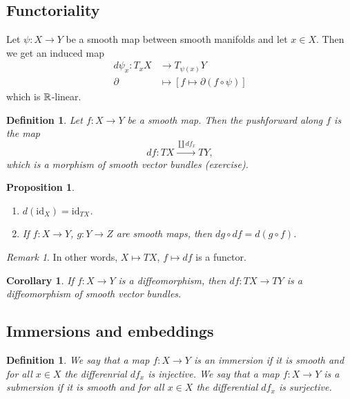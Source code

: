 \documentclass[A4paper, british]{amsart}
\theoremstyle{darkgreentheorem}
\newtheorem{prop}[thm]{Proposition}
\newtheorem{cor}[thm]{Corollary}
\theoremstyle{darkbluedefinition}
\newtheorem{defn}[thm]{Definition}
\theoremstyle{darkredexample}
\theoremstyle{remark}
\newtheorem{rem}[thm]{Remark}
\newcommand{\1}{\mathbbm{1}}
\newcommand{\id}{\mathrm{id}}
\begin{document}
\subsection{Functoriality}

Let $\psi\colon X\to Y$ be a smooth map between smooth manifolds and let $x\in X$.
Then we get an induced map
\begin{align*}
    d\psi_{x}\colon T_{x}X&\longrightarrow T_{\psi(x)}Y \\
    \partial &\longmapsto [f\mapsto \partial(f\circ \psi)]
\end{align*}
which is $\mathbb{R}$-linear.

\begin{defn}
    Let $f\colon X\to Y$ be a smooth map.
    Then the \textit{pushforward along $f$} is the map
    \[df\colon TX\xrightarrow{\coprod df_{x}} TY, \]
    which is a morphism of smooth vector bundles (exercise).
\end{defn}

\begin{prop}
    \begin{enumerate}
	\item $d(\id_{X})=\id_{TX}$.
	\item If $f\colon X\to Y$, $g\colon Y\to Z$ are smooth maps, then $dg\circ df=d(g\circ f)$.
    \end{enumerate}
\end{prop}

\begin{rem}
    In other words, $X\mapsto TX$, $f\mapsto df$ is a functor.
\end{rem}

\begin{cor}
    If $f\colon X\to Y$ is a diffeomorphism, then $df\colon TX\to TY$ is a diffeomorphism of smooth vector bundles.
\end{cor}

\subsection{Immersions and embeddings}

\begin{defn}
    We say that a map $f\colon X\to Y$ is an \textit{immersion} if it is smooth and for all $x\in X$ the differenrial $df_{x}$ is injective.
    We say that a map $f\colon X\to Y$ is a \textit{submersion} if it is smooth and for all $x\in X$ the differential $df_{x}$ is surjective.
\end{defn}
\end{document}
